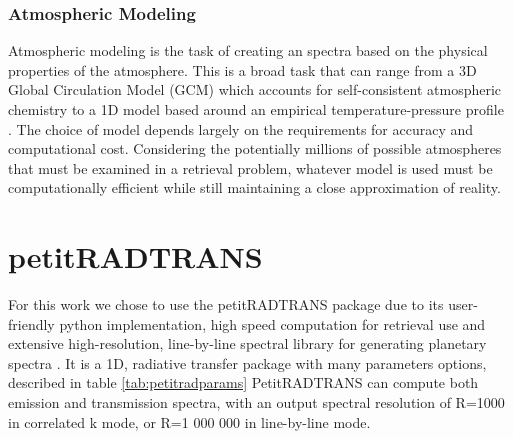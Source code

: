 \subsubsection{Atmospheric Modeling}
Atmospheric modeling is the task of creating an spectra based on the physical properties of the atmosphere.
This is a broad task that can range from a 3D Global Circulation Model (GCM) which accounts for self-consistent atmospheric chemistry \parencite{Chen2019} to a 1D model based around an empirical temperature-pressure profile \parencite{Molliere2019}.
The choice of model depends largely on the requirements for accuracy and computational cost. 
Considering the potentially millions of possible atmospheres that must be examined in a retrieval problem, whatever model is used must be computationally efficient while still maintaining a close approximation of reality.

\section{petitRADTRANS}
For this work we chose to use the petitRADTRANS package due to its user-friendly python implementation, high speed computation for retrieval use and extensive high-resolution, line-by-line spectral library for generating planetary spectra \parencite{Molliere2019}. 
It is a 1D, radiative transfer package with many parameters options, described in table \ref{tab:petitradparams}
PetitRADTRANS can compute both emission and transmission spectra, with an output spectral resolution of R=1000 in correlated k mode, or R=1 000 000 in line-by-line mode. 

